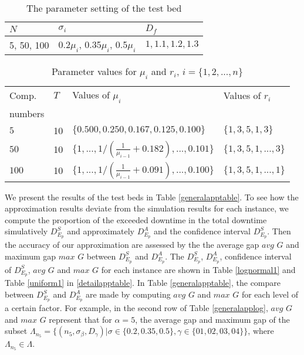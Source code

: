 \documentclass[preprint,12pt]{elsarticle}
\begin{document}
\begin{table}[htbp]
  \centering
  \caption{The parameter setting of the test bed}
    \begin{tabular}{lll}
    \toprule
  $N$ & $\sigma_{i}$ & $D_{f}$\\
    \midrule
    5, 50, 100 & 0.2$\mu_{i}$, 0.35$\mu_{i}$, 0.5$\mu_{i}$ & $ 1, 1.1, 1.2, 1.3$ \\
  \bottomrule
    \end{tabular}%
  \label{tab:testbedps}%
\end{table}

\begin{table}[htbp]
  \centering
  \caption{Parameter values for $\mu_{i}$ and $r_{i}$, $i=\{1,2,...,n\}$}
    \begin{tabular}{llll}
    \toprule
    Comp. & $T$ &Values of $\mu_{i}$ & Values of $r_{i}$\\
    numbers & & & \\
    \midrule
    $5$   &10& $\{0.500, 0.250, 0.167, 0.125, 0.100\}$ &$\{1,3,5,1,3\}$\\
    $50$  &10& $\{1,...,1/(\frac{1}{\mu_{i-1}}+0.182),...,0.101\}$ &$\{1,3,5,1,...,3\}$\\
    $100$ &10& $\{1,...,1/(\frac{1}{\mu_{i-1}}+0.091),...,0.100\}$ &$\{1,3,5,1,...,1\}$\\
    \bottomrule
    \end{tabular}%
  \label{tab:testbedmur}%
\end{table}

We present the results of the test beds in Table \ref{generalapptable}. To see how the approximation results deviate from the simulation results for each instance, we compute the proportion of the exceeded downtime in the total downtime simulatively $D_{E_{p}}^{S}$ and approximately $D_{E_{p}}^{A}$ and the confidence interval $D_{E_{p}}^{S}$. Then the accuracy of our approximation are assessed by the the average gap $avg$ $G$ and maximum gap $max$ $G$ between $D_{E_{p}}^{S}$ and $D_{E_{p}}^{A}$. The $D_{E_{p}}^{S}$, $D_{E_{p}}^{A}$, confidence interval of $D_{E_{p}}^{S}$, $avg$ $G$ and $max$ $G$ for each instance are shown in Table \ref{lognormal1} and Table \ref{uniform1} in \ref{detailapptable}. In Table \ref{generalapptable}, the compare between $D_{E_{p}}^{S}$ and $D_{E_{p}}^{A}$ are made by computing $avg$ $G$ and $max$ $G$ for each level of a certain factor. For example, in the second row of Table \ref{generalapplog}, $avg$ $G$ and $max$ $G$ represent that for $\alpha = 5$, the average gap and maximum gap of the subset $\Lambda_{n_{5}}=\{(n_{5},\sigma_{\beta},D_{\gamma})|\sigma\in\{0.2,0.35,0.5\},\gamma\in\{01,02,03,04\}\}$, where $\Lambda_{n_{5}}\in \Lambda$.
\end{document}
